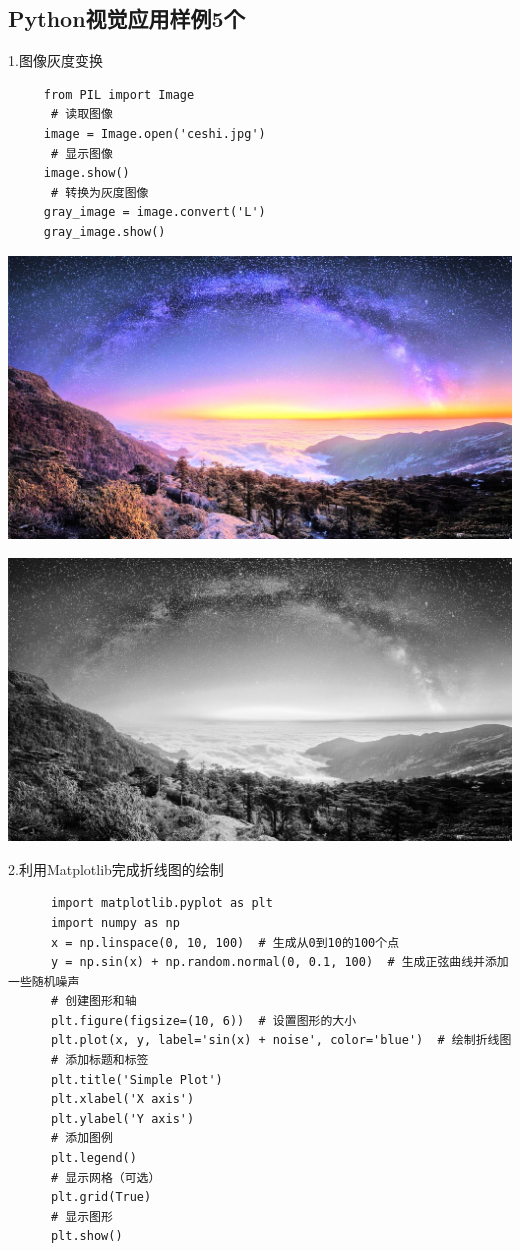 \documentclass{article}
\begin{document}
\subsection{Python视觉应用样例5个}
1.图像灰度变换
  \begin{verbatim}
     from PIL import Image
      # 读取图像
     image = Image.open('ceshi.jpg') 
      # 显示图像
     image.show()
      # 转换为灰度图像
     gray_image = image.convert('L')
     gray_image.show()
  \end{verbatim}

\noindent
\begin{minipage}{\linewidth}
 \centering
  \includegraphics[width=0.5\linewidth]{ceshi.jpg}
  \label{fig:example}
\end{minipage}

\noindent
\begin{minipage}{\linewidth}
 \centering
  \includegraphics[width=0.5\linewidth]{huise.png}
  \label{fig:example}
\end{minipage}

2.利用Matplotlib完成折线图的绘制
    \begin{verbatim}
      import matplotlib.pyplot as plt
      import numpy as np
      x = np.linspace(0, 10, 100)  # 生成从0到10的100个点
      y = np.sin(x) + np.random.normal(0, 0.1, 100)  # 生成正弦曲线并添加一些随机噪声
      # 创建图形和轴
      plt.figure(figsize=(10, 6))  # 设置图形的大小
      plt.plot(x, y, label='sin(x) + noise', color='blue')  # 绘制折线图
      # 添加标题和标签
      plt.title('Simple Plot')
      plt.xlabel('X axis')
      plt.ylabel('Y axis')
      # 添加图例
      plt.legend()
      # 显示网格（可选）
      plt.grid(True)
      # 显示图形
      plt.show()
   \end{verbatim}
\end{document}
